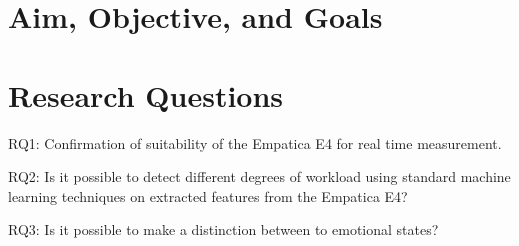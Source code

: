 

\section{Aim, Objective, and Goals}
\section{Research Questions}
RQ1: Confirmation of suitability of the Empatica E4 for real time measurement.

RQ2: Is it possible to detect different degrees of workload using standard machine learning techniques on extracted features from the Empatica E4?

RQ3: Is it possible to make a distinction between to emotional states?

